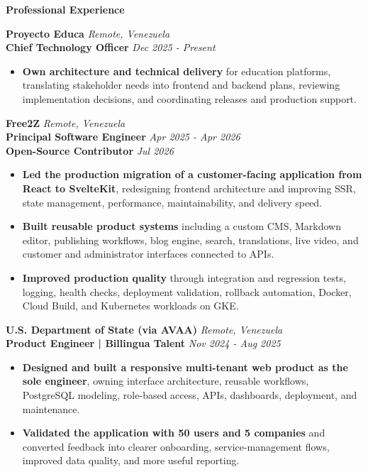 \documentclass[10pt]{article}
\newcommand{\sectiontitle}[1]{%
    \vspace{3pt}
    \begin{center}
        \textbf{#1}
    \end{center}
    \vspace{-5pt}
}
\begin{document}
\sectiontitle{Professional Experience}
\textbf{Proyecto Educa} \hfill \textit{Remote, Venezuela} \\
\textbf{Chief Technology Officer} \hfill \textit{Dec 2025 - Present}
\begin{itemize}
    \item \textbf{Own architecture and technical delivery} for education platforms, translating stakeholder needs into frontend and backend plans, reviewing implementation decisions, and coordinating releases and production support.
\end{itemize}

\vspace{1pt}
\textbf{Free2Z} \hfill \textit{Remote, Venezuela} \\
\textbf{Principal Software Engineer} \hfill \textit{Apr 2025 - Apr 2026} \\
\textbf{Open-Source Contributor} \hfill \textit{Jul 2026}
\begin{itemize}
    \item \textbf{Led the production migration of a customer-facing application from React to SvelteKit}, redesigning frontend architecture and improving SSR, state management, performance, maintainability, and delivery speed.
    \item \textbf{Built reusable product systems} including a custom CMS, Markdown editor, publishing workflows, blog engine, search, translations, live video, and customer and administrator interfaces connected to APIs.
    \item \textbf{Improved production quality} through integration and regression tests, logging, health checks, deployment validation, rollback automation, Docker, Cloud Build, and Kubernetes workloads on GKE.
\end{itemize}

\vspace{1pt}
\textbf{U.S. Department of State (via AVAA)} \hfill \textit{Remote, Venezuela} \\
\textbf{Product Engineer | Billingua Talent} \hfill \textit{Nov 2024 - Aug 2025}
\begin{itemize}
    \item \textbf{Designed and built a responsive multi-tenant web product as the sole engineer}, owning interface architecture, reusable workflows, PostgreSQL modeling, role-based access, APIs, dashboards, deployment, and maintenance.
    \item \textbf{Validated the application with 50 users and 5 companies} and converted feedback into clearer onboarding, service-management flows, improved data quality, and more useful reporting.
\end{itemize}
\end{document}
